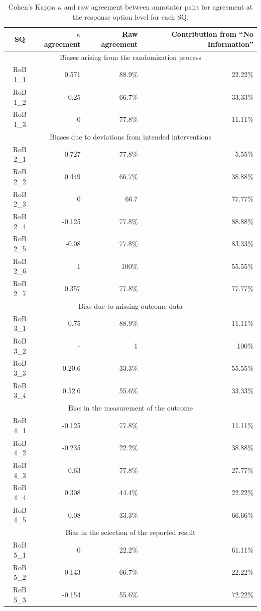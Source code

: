 \documentclass[sn-mathphys,Numbered]{sn-jnl}%
\theoremstyle{thmstyleone}%
\theoremstyle{thmstyletwo}%
\theoremstyle{thmstylethree}%
\begin{document}
%
%
%
\begin{table}[]
    \caption{Cohen's Kappa $\kappa$ and raw agreement between annotator pairs for agreement at the response option level for each SQ.}
    \label{tab:IAA_response}
    \begin{tabular}{crrr}
    \toprule[1.0pt]
        SQ & $\kappa$ agreement & Raw agreement & Contribution from ``No Information'' \\
    \midrule[1.0pt]
        \multicolumn{4}{c}{Biases arising from the randomization process} \\
        \hline
        RoB 1\_1 & 0.571 & 88.9\%  & 22.22\% \\
        RoB 1\_2 & 0.25 & 66.7\%  & 33.33\% \\
        RoB 1\_3 & 0 & 77.8\%  & 11.11\% \\
        \hline 
        \multicolumn{4}{c}{Biases due to deviations from intended interventions} \\
        \hline
        RoB 2\_1 & 0.727 & 77.8\%  & 5.55\% \\
        RoB 2\_2 & 0.449 & 66.7\%  & 38.88\% \\
        RoB 2\_3 & 0 & 66.7 & 77.77\% \\
        RoB 2\_4 & -0.125 & 77.8\%  & 88.88\% \\
        RoB 2\_5 & -0.08 & 77.8\%  & 83.33\% \\
        RoB 2\_6 & 1 & 100\%  & 55.55\% \\
        RoB 2\_7 & 0.357 & 77.8\%  & 77.77\% \\
        \hline
        \multicolumn{4}{c}{Bias due to missing outcome data} \\
        \hline
        RoB 3\_1 & 0.75 & 88.9\%  & 11.11\% \\
        RoB 3\_2 & - & 1 & 100\% \\
        RoB 3\_3 & 0.20.6 & 33.3\%  & 55.55\% \\
        RoB 3\_4 & 0.52.6 & 55.6\%  & 33.33\% \\
        \hline
        \multicolumn{4}{c}{Bias in the measurement of the outcome} \\
        \hline
        RoB 4\_1 & -0.125 & 77.8\%  & 11.11\% \\
        RoB 4\_2 & -0.235 & 22.2\%  & 38.88\% \\
        RoB 4\_3 & 0.63 & 77.8\%  & 27.77\% \\
        RoB 4\_4 & 0.308 & 44.4\%  & 22.22\% \\
        RoB 4\_5 & -0.08 & 33.3\%  & 66.66\% \\
        \hline
        \multicolumn{4}{c}{Bias in the selection of the reported result} \\
        \hline
        RoB 5\_1 & 0 & 22.2\%  & 61.11\% \\
        RoB 5\_2 & 0.143 & 66.7\%  & 22.22\% \\
        RoB 5\_3 & -0.154 & 55.6\%  & 72.22\% \\
    \bottomrule[1.0pt]
    \end{tabular}
\end{table}
\end{document}
